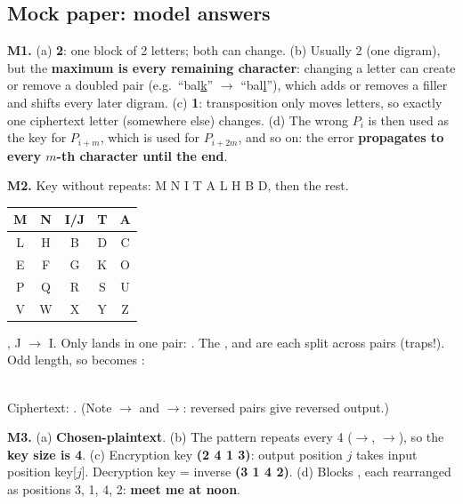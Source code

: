 \clearpage
\subsection{Mock paper: model answers}

\textbf{M1.} (a) \textbf{2}: one block of 2 letters; both can change. (b) Usually 2 (one digram), but the \textbf{maximum is every remaining character}: changing a letter can create or remove a doubled pair (e.g.\ ``bal\underline{k}'' $\to$ ``bal\underline{l}''), which adds or removes a filler and shifts every later digram. (c) \textbf{1}: transposition only moves letters, so exactly one ciphertext letter (somewhere else) changes. (d) The wrong $P_i$ is then used as the key for $P_{i+m}$, which is used for $P_{i+2m}$, and so on: the error \textbf{propagates to every $m$-th character until the end}.

\textbf{M2.} Key without repeats: M N I T A L H B D, then the rest.
\begin{center}\small
\begin{minipage}[c]{0.25\textwidth}\centering
\begin{tabular}{|*{5}{c|}}\hline M&N&I/J&T&A\\\hline L&H&B&D&C\\\hline E&F&G&K&O\\\hline P&Q&R&S&U\\\hline V&W&X&Y&Z\\\hline\end{tabular}
\end{minipage}
\begin{minipage}[c]{0.7\textwidth}
, J $\to$ I. Only  lands in one pair: . The ,  and  are each split across pairs (traps!). Odd length, so  becomes :\\
\\[2pt]
\end{minipage}
\end{center}
Ciphertext: \textbf{}. (Note $\to$ and $\to$: reversed pairs give reversed output.)

\textbf{M3.} (a) \textbf{Chosen-plaintext}. (b) The pattern repeats every 4 ($\to$, $\to$), so the \textbf{key size is 4}.
(c) Encryption key \textbf{(2 4 1 3)}: output position $j$ takes input position key[$j$]. Decryption key = inverse \textbf{(3 1 4 2)}.
(d) Blocks , each rearranged as positions 3, 1, 4, 2: \textbf{meet me at noon}.

